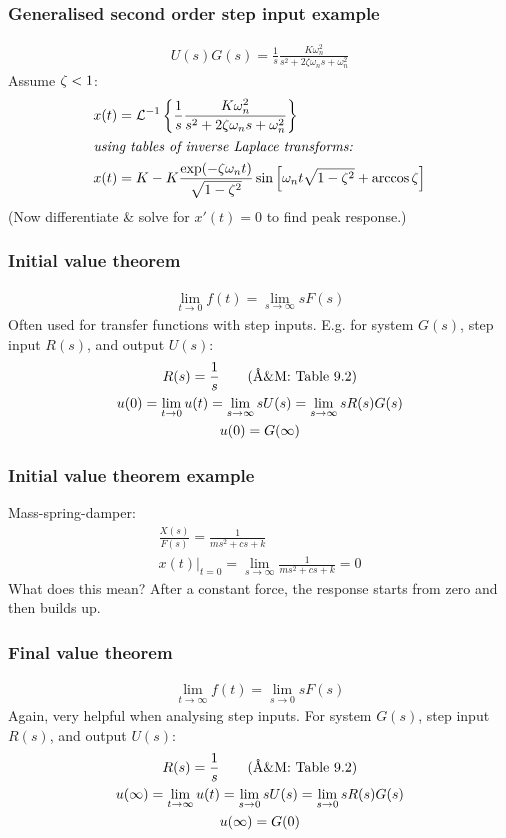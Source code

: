 \documentclass{beamer-control}
\begin{document}
\begin{frame}
\frametitle{Generalised second order step input example}

\begin{gather}
U(s) G(s) = \frac{1}{s}\frac{K\omega_n^2}{s^2+2\zeta\omega_ns+\omega_n^2}
\end{gather}
Assume $\zeta<1$:
\begin{align}
x(t) &= \mathcal{L}^{-1}\left\{ \frac{1}{s}\frac{K\omega_n^2}{s^2+2\zeta\omega_n s+\omega_n^2} \right\} \\
\intertext{\em using tables of inverse Laplace transforms:}
x(t) &= K - K\frac{\exp(-\zeta\omega_n t)}{\sqrt{1-\zeta^2}}\sin\left[\omega_n t\sqrt{1-\zeta^2}+\arccos\zeta\right] \label{eq:xt2o}
\end{align}
(Now differentiate \& solve for $x'(t)=0$ to find peak response.)

\end{frame}


\begin{frame}
\frametitle{Initial value theorem}

\begin{gather}
\lim_{t\to0} f(t) = \lim_{s\to\infty} s F(s)
\end{gather}
Often used for transfer functions with step inputs. E.g. for system $G(s)$, step input $R(s)$, and output $U(s)$:
\begin{gather}
R(s) = \frac{1}{s} \qquad\text{(\AA\&M: Table 9.2)}\\
u(0) = \lim_{t\to0} u(t) = \lim_{s\to\infty} s U(s) = \lim_{s\to\infty} s R(s)G(s) \\
u(0) = G(\infty)
\end{gather}
\end{frame}

\begin{frame}
\frametitle{Initial value theorem example}

Mass-spring-damper:
\begin{gather}
\frac{X(s)}{F(s)} = \frac{1}{ms^2+cs+k} \\
x(t)|_{t=0} = \lim_{s\to\infty} \frac{1}{ms^2+cs+k} = 0
\end{gather}
What does this mean? After a constant force, the response starts from zero and then builds up.

\bigskip
{}
\end{frame}

\begin{frame}
\frametitle{Final value theorem}

\begin{gather}
\lim_{t\to\infty} f(t) = \lim_{s\to0} s F(s)
\end{gather}
Again, very helpful when analysing step inputs. For system $G(s)$, step input $R(s)$, and output $U(s)$:
\begin{gather}
R(s) = \frac{1}{s} \qquad\text{(\AA\&M: Table 9.2)}\\
u(\infty) = \lim_{t\to\infty} u(t) = \lim_{s\to0} s U(s) = \lim_{s\to0} s R(s)G(s) \\
u(\infty) = G(0)
\end{gather}
\end{frame}
\end{document}
